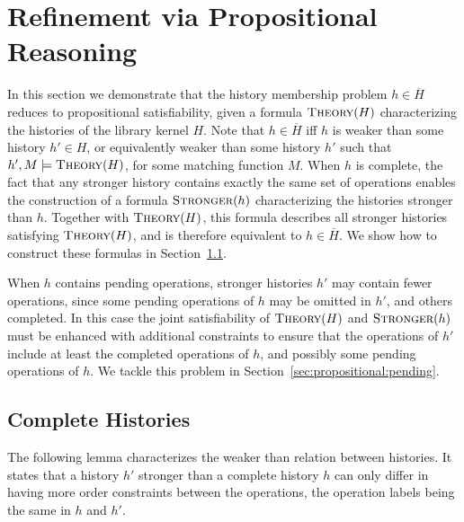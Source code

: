 
\section{Refinement via Propositional Reasoning}
\label{sec:propositional}

In this section we demonstrate that the history membership problem $h \in
\overline{H}$ reduces to propositional satisfiability, given a formula
$\textsc{Theory}(H)$ characterizing the histories of the library kernel $H$.
Note that $h \in \overline{H}$ if{f} $h$ is weaker than some history $h' \in
H$, or equivalently weaker than some history $h'$ such that
$h',M \models \textsc{Theory}(H)$, for some matching function $M$. When
$h$ is complete, the fact that any stronger history contains exactly the same
set of operations enables the construction of a formula $\textsc{Stronger}(h)$
characterizing the histories stronger than $h$. Together with
$\textsc{Theory}(H)$, this formula describes all stronger histories satisfying
$\textsc{Theory}(H)$, and is therefore equivalent to $h \in \overline{H}$. We show how
to construct these formulas in Section~\ref{sec:propositional:complete}.

When $h$ contains pending operations, stronger histories $h'$ may contain fewer
operations, since some pending operations of $h$ may be omitted in $h'$, and
others completed. In this case the joint satisfiability of $\textsc{Theory}(H)$
and $\textsc{Stronger}(h)$ must be enhanced with additional constraints to
ensure that the operations of $h'$ include at least the completed operations of
$h$, and possibly some pending operations of $h$. We tackle this problem in
Section~\ref{sec:propositional:pending}.

\subsection{Complete Histories}
\label{sec:propositional:complete}

The following lemma characterizes the weaker than relation between
histories. It states that a history $h'$ stronger than a complete history $h$
can only differ in having more order constraints between the operations, the
operation labels being the same in $h$ and $h'$.

%
%

